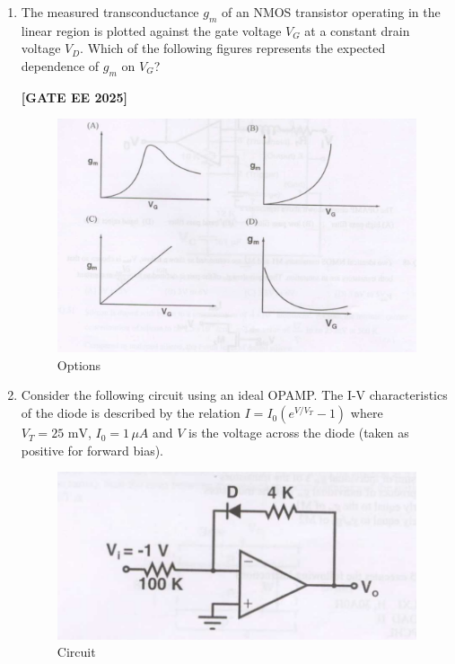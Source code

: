 \documentclass[12pt]{article}
\begin{document}
\begin{enumerate}[leftmargin=*, label=\textbf{Q.\arabic*:}]
The current $I_X$ is related to $I_{bias}$ as
 
\noindent \textbf{[GATE EE 2025]}
\begin{multicols}{2}
\begin{enumerate}
  \item $I_X = I_{bias} + I_S$
  \item $I_X = I_{bias}$
  \item $I_X = I_{bias} - I_S$
  \item $I_X = I_{bias}\left( \dfrac{V_{DD} - V_{out}}{R_E} \right)$
\end{enumerate}
\end{multicols}

\item The measured transconductance $g_m$ of an NMOS transistor operating in the linear region is plotted against the gate voltage $V_G$ at a constant drain voltage $V_D$. Which of the following figures represents the expected dependence of $g_m$ on $V_G$?
 
\noindent \textbf{[GATE EE 2025]}
\begin{figure}[H]\centering
\includegraphics[width=0.95\columnwidth]{figs/q45.png}
\caption{Options}
\label{fig:q45}
\end{figure}

\item Consider the following circuit using an ideal OPAMP. The I-V characteristics of the diode is described by the relation $I = I_0 \left( e^{V/V_T} - 1 \right)$ where $V_T = 25\text{ mV}$, $I_0 = 1\,\mu A$ and $V$ is the voltage across the diode (taken as positive for forward bias).

\begin{figure}[H]\centering
\includegraphics[width=0.5\columnwidth]{figs/q46.png}
\caption{Circuit}
\label{fig:q46}
\end{figure}


\end{enumerate}
\end{document}
